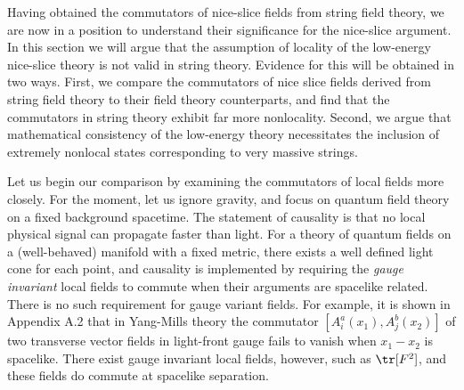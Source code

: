 

Having obtained the commutators of nice-slice fields from string
field theory, we are now in a position to understand their
significance for the nice-slice argument.  In this section we will
argue that the assumption of locality of the low-energy nice-slice
theory is not valid in string theory.  Evidence for this will be
obtained in two ways.  First, we compare the commutators of nice
slice fields derived from string field theory to their field theory
counterparts, and find that the commutators in string theory exhibit
far more nonlocality.  Second, we argue that mathematical consistency
of the low-energy theory necessitates the inclusion of extremely
nonlocal states corresponding to very massive strings.


Let us begin our comparison by examining the commutators of local
fields more closely.  For the moment, let us ignore gravity, and
focus on quantum field theory on a fixed background spacetime.  The
statement of causality is that no local physical signal can propagate
faster than light.  For a theory of quantum fields on a
(well-behaved) manifold with a fixed metric, there exists a well
defined light cone for each point, and causality is implemented by
requiring the {\it gauge invariant} local fields to commute when
their
arguments are spacelike related.  There is no such requirement for
gauge variant fields.  For example, it is shown in
Appendix A.2 that in Yang-Mills theory the commutator
$[A_i^a(x_1),A_j^b(x_2)]$ of two transverse vector fields in
light-front gauge fails to vanish when $x_1-x_2$ is spacelike.  There
exist
gauge invariant local fields, however, such as $\tr [F^2]$,
and these fields do commute at spacelike separation.

